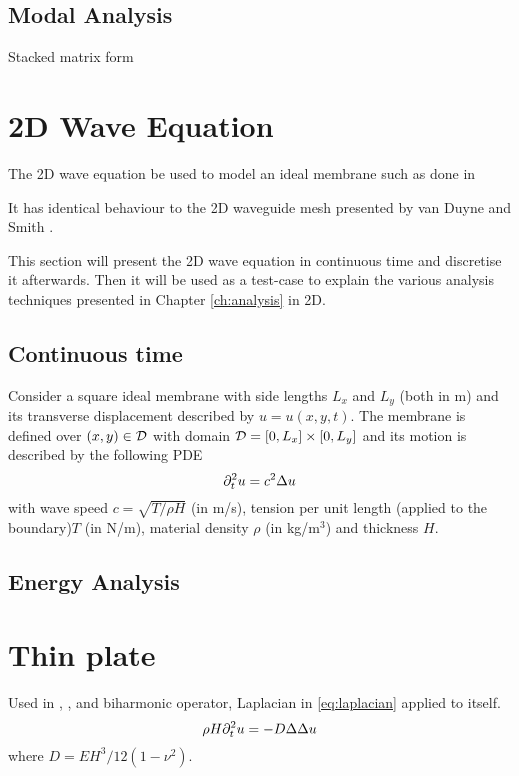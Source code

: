 \subsection{Modal Analysis}
Stacked matrix form

\section{2D Wave Equation}
The 2D wave equation be used to model an ideal membrane such as done in 

It has identical behaviour to the 2D waveguide mesh presented by van Duyne and Smith \cite{Duyne1993}.

This section will present the 2D wave equation in continuous time and discretise it afterwards. Then it will be used as a test-case to explain the various analysis techniques presented in Chapter \ref{ch:analysis} in 2D.

\subsection{Continuous time}
Consider a square ideal membrane with side lengths $L_x$ and $L_y$ (both in m) and its transverse displacement described by $u = u(x,y,t)$. The membrane is defined over $(x,y) \in \mathcal{D}$ with domain $\mathcal{D} = [0, L_x] \times[0, L_y]$ and its motion is described by the following PDE
\begin{equation}\label{eq:2DwavePDE}
    \partial_t^2 u = c^2\Delta u
\end{equation}
with wave speed $c = \sqrt{T/\rho H}$ (in m/s), tension per unit length (applied to the boundary)$T$ (in N/m), material density $\rho$ (in kg/m$^3$) and thickness $H$.



\subsection{Energy Analysis}

\section{Thin plate}\label{sec:thinPlate}
Used in \citeP[A], \citeP[B], \citeP[D] and \citeP[E]
biharmonic operator, Laplacian in \eqref{eq:laplacian} applied to itself.
\begin{equation}\label{eq:platePDENoLosses}
    \rho H \partial_t^2 u = -D\Delta\Delta u
\end{equation}
where $D = EH^3/12(1-\nu^2)$.

